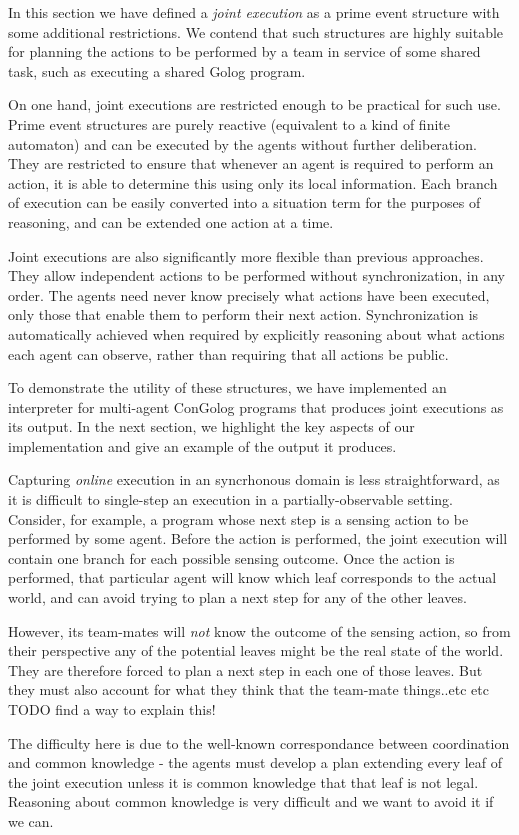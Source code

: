 In this section we have defined a \emph{joint execution} as a prime
event structure with some additional restrictions. We contend that
such structures are highly suitable for planning the actions to be
performed by a team in service of some shared task, such as executing
a shared Golog program.

On one hand, joint executions are restricted enough to be practical
for such use. Prime event structures are purely reactive (equivalent
to a kind of finite automaton) and can be executed by the agents without
further deliberation. They are restricted to ensure that whenever
an agent is required to perform an action, it is able to determine
this using only its local information. Each branch of execution can
be easily converted into a situation term for the purposes of reasoning,
and can be extended one action at a time.

Joint executions are also significantly more flexible than previous
approaches. They allow independent actions to be performed without
synchronization, in any order. The agents need never know precisely
what actions have been executed, only those that enable them to perform
their next action. Synchronization is automatically achieved when
required by explicitly reasoning about what actions each agent can
observe, rather than requiring that all actions be public.

To demonstrate the utility of these structures, we have implemented
an interpreter for multi-agent ConGolog programs that produces joint
executions as its output. In the next section, we highlight the key
aspects of our implementation and give an example of the output it
produces.

Capturing \emph{online} execution in an syncrhonous domain is less
straightforward, as it is difficult to single-step an execution in
a partially-observable setting. Consider, for example, a program whose
next step is a sensing action to be performed by some agent. Before
the action is performed, the joint execution will contain one branch
for each possible sensing outcome. Once the action is performed, that
particular agent will know which leaf corresponds to the actual world,
and can avoid trying to plan a next step for any of the other leaves.

However, its team-mates will \emph{not} know the outcome of the sensing
action, so from their perspective any of the potential leaves might
be the real state of the world. They are therefore forced to plan
a next step in each one of those leaves. But they must also account
for what they think that the team-mate things..etc etc TODO find a
way to explain this!

The difficulty here is due to the well-known correspondance between
coordination and common knowledge - the agents must develop a plan
extending every leaf of the joint execution unless it is common knowledge
that that leaf is not legal. Reasoning about common knowledge is very
difficult and we want to avoid it if we can.

